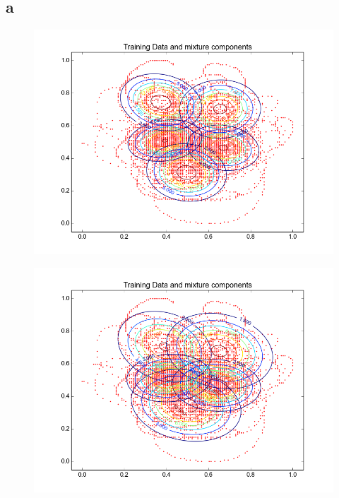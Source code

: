 \documentclass[11pt,a4paper]{article}
\begin{document}
\subsection{a}
\begin{minipage}[b]{0.25\textwidth}
\begin{figure}[H]
  \centering
  \includegraphics[width=.8\linewidth]{Figures/contours_a.test0.png}
  \label{fig:sfig1}
\end{figure}%
\end{minipage}
\begin{minipage}[b]{0.25\textwidth}
\begin{figure}[H]
  \centering
  \includegraphics[width=.8\linewidth]{Figures/contours_a.test5.png}

  \label{fig:sfig1}
\end{figure}%
\end{minipage}
\end{document}
